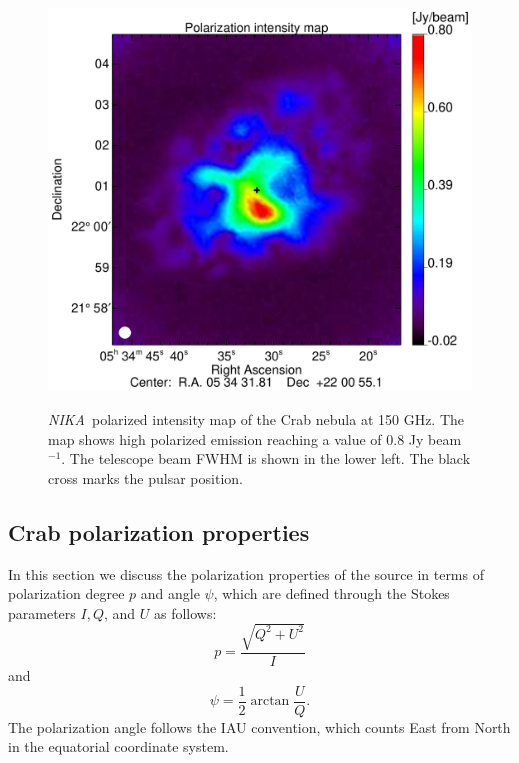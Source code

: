 \documentclass[twocolumn,traditabstract]{aa}
\def\NIKA{\textit{NIKA}}
\begin{document}
 \begin{figure}
  \centering
      {\includegraphics[width=0.75\linewidth,keepaspectratio]{figures/Crab_ipol_v3_2mm.pdf}}
\caption{\NIKA\ polarized intensity map of the  Crab nebula at 150 GHz. The map shows high polarized emission reaching a value of 0.8 Jy beam$^{-1}$. The telescope beam FWHM is shown in the lower left. The black cross marks the pulsar position.}
\label{crab_ipol_maps}		
  \end{figure}
 


\subsection{Crab polarization properties}\label{sec:pol_properties}
In this section we discuss the polarization properties of the source in terms of polarization degree $p$ and angle $\psi$, which are defined through the Stokes parameters $I, Q$, and $U$ as follows:
\begin{equation}
 p    = \frac{\sqrt{Q^2 + U^2}}{I} \nonumber 
\end{equation}
and
 \begin{equation}
 \psi = \frac{1}{2}\arctan\frac{U}{Q}.\label{angledegree_polar}
 \end{equation}
The polarization angle follows the IAU convention, which counts East from North in the equatorial coordinate system.
\end{document}
